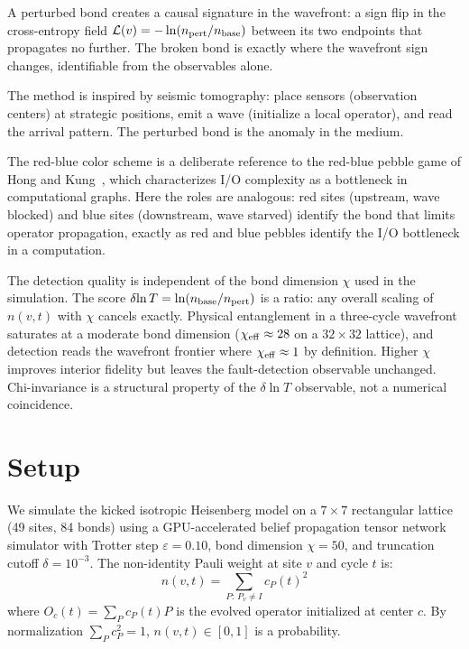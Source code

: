 \documentclass[11pt]{article}
\begin{document}
A perturbed bond creates a causal signature in the wavefront: a sign flip
in the cross-entropy field $\mathcal{L}(v) = -\ln(n_{\rm pert}/n_{\rm base})$
between its two endpoints that propagates no further. The broken bond is
exactly where the wavefront sign changes, identifiable from the observables
alone.

The method is inspired by seismic tomography: place sensors (observation
centers) at strategic positions, emit a wave (initialize a local operator),
and read the arrival pattern. The perturbed bond is the anomaly in the medium.

The red-blue color scheme is a deliberate reference to the red-blue pebble
game of Hong and Kung~\cite{hong1981pebble}, which characterizes I/O
complexity as a bottleneck in computational graphs. Here the roles are
analogous: red sites (upstream, wave blocked) and blue sites (downstream,
wave starved) identify the bond that limits operator propagation, exactly
as red and blue pebbles identify the I/O bottleneck in a computation.

The detection quality is independent of the bond dimension $\chi$ used in the
simulation. The score $\delta\!\ln T = \ln(n_{\rm base}/n_{\rm pert})$ is a
ratio: any overall scaling of $n(v,t)$ with $\chi$ cancels exactly. Physical
entanglement in a three-cycle wavefront saturates at a moderate bond dimension
($\chi_{\rm eff}\approx 28$ on a $32\times32$ lattice), and detection reads
the wavefront frontier where $\chi_{\rm eff}\approx 1$ by definition. Higher
$\chi$ improves interior fidelity but leaves the fault-detection observable
unchanged. Chi-invariance is a structural property of the $\delta\!\ln T$
observable, not a numerical coincidence.

\section{Setup}

We simulate the kicked isotropic Heisenberg model on a $7\times7$ rectangular
lattice (49 sites, 84 bonds) using a GPU-accelerated belief propagation tensor
network simulator with Trotter step $\varepsilon=0.10$, bond dimension
$\chi=50$, and truncation cutoff $\delta=10^{-3}$.
The non-identity Pauli weight at site $v$ and cycle $t$ is:
\begin{equation}
    n(v,t) = \sum_{P:\,P_v \neq I} c_P(t)^2
\end{equation}
where $O_c(t) = \sum_P c_P(t) P$ is the evolved operator initialized at
center $c$. By normalization $\sum_P c_P^2 = 1$, $n(v,t) \in [0,1]$ is
a probability.
\end{document}
